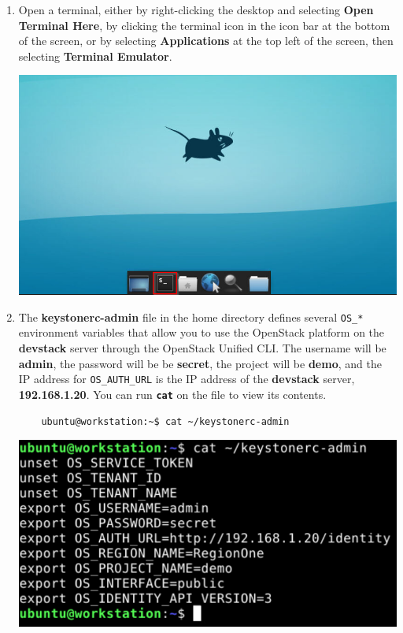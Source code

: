 \documentclass[letterpaper, 12pt]{article}
\begin{document}
\begin{enumerate}
    \item Open a terminal, either by right-clicking the desktop and selecting \textbf{Open Terminal Here}, by clicking
    the terminal icon in the icon bar at the bottom of the screen, or by selecting \textbf{Applications} at the top
    left of the screen, then selecting \textbf{Terminal Emulator}.

    \begin{center}
        \includegraphics[width=\linewidth]{images/part2/step1.png}
    \end{center}

    \item The \textbf{keystonerc-admin} file in the home directory defines several \texttt{OS\_*} environment variables
    that allow you to use the OpenStack platform on the \textbf{devstack} server through the OpenStack Unified
    CLI. The username will be \textbf{admin}, the password will be be \textbf{secret}, the project will be
    \textbf{demo}, and the IP address for \texttt{OS\_AUTH\_URL} is the IP address of the \textbf{devstack} server,
    \textbf{192.168.1.20}. You can run \textbf{\texttt{cat}} on the file to view its contents.
    \begin{lstlisting}
    ubuntu@workstation:~$ cat ~/keystonerc-admin
    \end{lstlisting}

    \begin{center}
        \includegraphics[width=\linewidth]{images/part2/step2.png}
    \end{center}


\end{enumerate}
\end{document}
